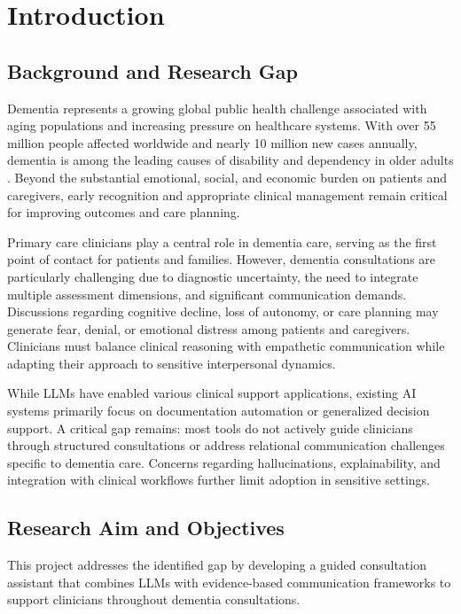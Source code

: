 \section{Introduction}\label{sec:introduction}

\subsection{Background and Research Gap}

Dementia represents a growing global public health challenge associated with aging populations and increasing pressure on healthcare systems. With over 55 million people affected worldwide and nearly 10 million new cases annually, dementia is among the leading causes of disability and dependency in older adults \citep{who_dementia}. Beyond the substantial emotional, social, and economic burden on patients and caregivers, early recognition and appropriate clinical management remain critical for improving outcomes and care planning.

Primary care clinicians play a central role in dementia care, serving as the first point of contact for patients and families. However, dementia consultations are particularly challenging due to diagnostic uncertainty, the need to integrate multiple assessment dimensions, and significant communication demands. Discussions regarding cognitive decline, loss of autonomy, or care planning may generate fear, denial, or emotional distress among patients and caregivers. Clinicians must balance clinical reasoning with empathetic communication while adapting their approach to sensitive interpersonal dynamics.

While LLMs have enabled various clinical support applications, existing AI systems primarily focus on documentation automation or generalized decision support. A critical gap remains: most tools do not actively guide clinicians through structured consultations or address relational communication challenges specific to dementia care. Concerns regarding hallucinations, explainability, and integration with clinical workflows further limit adoption in sensitive settings.

\subsection{Research Aim and Objectives}\label{sec:aim}

This project addresses the identified gap by developing a guided consultation assistant that combines LLMs with evidence-based communication frameworks to support clinicians throughout dementia consultations.


